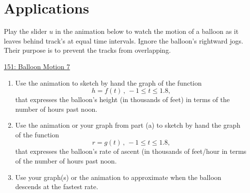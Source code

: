 \documentclass{ximera}
\begin{document}
\section*{Applications}

\begin{question}  \label{Qdftgtr45t5t}

Play the slider $u$ in the animation below to watch the motion of a balloon as it leaves behind track's at equal time intervals. Ignore the balloon's rightward jogs. Their purpose is to prevent the tracks from overlapping.

\begin{onlineOnly}
    \begin{center}
\end{center}
\end{onlineOnly}
\end{question}

\href{https://www.desmos.com/calculator/h91txxjcmi}{151: Balloon Motion 7}


\begin{enumerate}
\item Use the animation to sketch by hand the graph of the function 
\[
   h = f(t) \, , \, -1 \leq t \leq 1.8 ,       
\]
that expresses the balloon's height (in thousands of feet) in terms of the number of hours past noon.

\item Use the animation or your graph from part (a) to sketch by hand the graph of the function 
\[
     r = g(t) \, , \, -1 \leq t \leq 1.8 ,
\]
that expresses the balloon's rate of ascent (in thousands of feet/hour  in terms of the number of hours past noon.

\item Use your graph(s) or the animation to approximate when the balloon descends at the fastest rate.

\end{enumerate}
\end{document}
